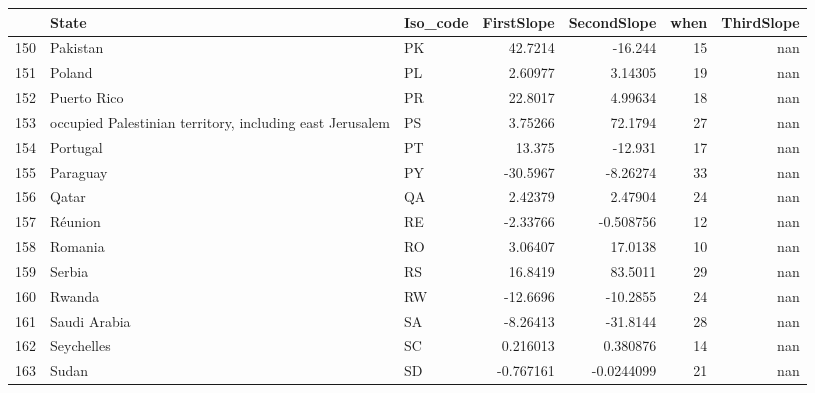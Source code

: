 \begin{tabular}{rllrrrr}
\hline
     & State                                                    & Iso\_code   &    FirstSlope &   SecondSlope &   when &   ThirdSlope \\
\hline
 150 & Pakistan                                                 & PK         &   42.7214     &  -16.244      &     15 &    nan       \\
 151 & Poland                                                   & PL         &    2.60977    &    3.14305    &     19 &    nan       \\
 152 & Puerto Rico                                              & PR         &   22.8017     &    4.99634    &     18 &    nan       \\
 153 & occupied Palestinian territory, including east Jerusalem & PS         &    3.75266    &   72.1794     &     27 &    nan       \\
 154 & Portugal                                                 & PT         &   13.375      &  -12.931      &     17 &    nan       \\
 155 & Paraguay                                                 & PY         &  -30.5967     &   -8.26274    &     33 &    nan       \\
 156 & Qatar                                                    & QA         &    2.42379    &    2.47904    &     24 &    nan       \\
 157 & Réunion                                                  & RE         &   -2.33766    &   -0.508756   &     12 &    nan       \\
 158 & Romania                                                  & RO         &    3.06407    &   17.0138     &     10 &    nan       \\
 159 & Serbia                                                   & RS         &   16.8419     &   83.5011     &     29 &    nan       \\
 160 & Rwanda                                                   & RW         &  -12.6696     &  -10.2855     &     24 &    nan       \\
 161 & Saudi Arabia                                             & SA         &   -8.26413    &  -31.8144     &     28 &    nan       \\
 162 & Seychelles                                               & SC         &    0.216013   &    0.380876   &     14 &    nan       \\
 163 & Sudan                                                    & SD         &   -0.767161   &   -0.0244099  &     21 &    nan       \\

\end{tabular}
